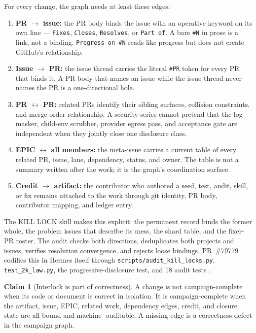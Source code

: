 \documentclass[11pt]{article}
\theoremstyle{definition}
\newtheorem{claim}{Claim}
\theoremstyle{plain}
\theoremstyle{remark}
\begin{document}
For every change, the graph needs at least these edges:
\begin{enumerate}[leftmargin=*]
\item \textbf{PR $\rightarrow$ issue:} the PR body binds the issue with an
  operative keyword on its own line --- \texttt{Fixes}, \texttt{Closes},
  \texttt{Resolves}, or \texttt{Part of}. A bare \texttt{\#N} in prose is a
  link, not a binding. \texttt{Progress on \#N} reads like progress but does
  not create GitHub's relationship.
\item \textbf{Issue $\rightarrow$ PR:} the issue thread carries the literal
  \texttt{\#PR} token for every PR that binds it. A PR body that names an
  issue while the issue thread never names the PR is a one-directional hole.
\item \textbf{PR $\leftrightarrow$ PR:} related PRs identify their sibling
  surfaces, collision constraints, and merge-order relationship. A security
  series cannot pretend that the log masker, child-env scrubber, provider
  egress pass, and acceptance gate are independent when they jointly close
  one disclosure class.
\item \textbf{EPIC $\leftrightarrow$ all members:} the meta-issue carries a
  current table of every related PR, issue, lane, dependency, status, and
  owner. The table is not a summary written after the work; it is the graph's
  coordination surface.
\item \textbf{Credit $\rightarrow$ artifact:} the contributor who authored a
  seed, test, audit, skill, or fix remains attached to the work through git
  identity, PR body, contributor mapping, and ledger entry.
\end{enumerate}

The KILL LOCK skill makes this explicit: the permanent record binds the former
whole, the problem issues that describe its mess, the shard table, and the
fixer-PR roster. The audit checks both directions, deduplicates both
projects and issues, verifies resolution convergence, and rejects loose
bindings. PR~\#79779 codifies this in Hermes itself through
\texttt{scripts/audit\_kill\_locks.py}, \texttt{test\_2k\_law.py},
the progressive-disclosure test, and 18 audit tests
\citep{hermespr79779}.

\begin{claim}[Interlock is part of correctness]
\label{cl:interlock-correctness}
A change is not campaign-complete when its code or document is correct in
isolation. It is campaign-complete when the artifact, issue, EPIC, related
work, dependency edges, credit, and closure state are all bound and machine-
auditable. A missing edge is a correctness defect in the campaign graph.
\end{claim}
\end{document}
